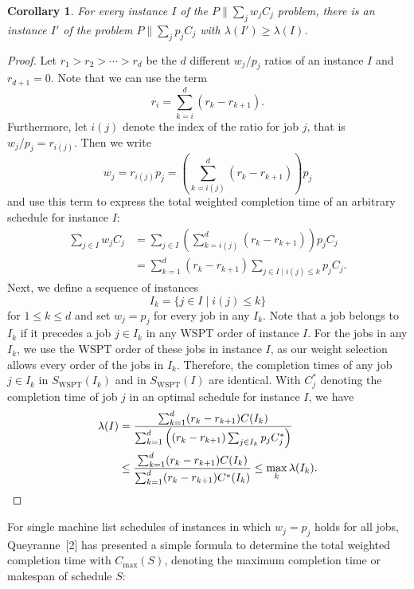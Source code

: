 \documentclass[11pt]{article}
\newtheorem{corollary}{Corollary}
\newcommand{\WSPT}{\mathrm{WSPT}}
\newcommand{\Cmax}{C_{\max}}
\begin{document}
\begin{corollary}
For every instance $I$ of the $P\|\sum_j w_j C_j$ problem, there is an
instance $I'$ of the problem $P\|\sum_j p_j C_j$ with
$\lambda(I')\geq \lambda(I)$.
\end{corollary}

\begin{proof}
Let $r_1>r_2>\cdots>r_d$ be the $d$ different $w_j/p_j$ ratios of an
instance $I$ and $r_{d+1}=0$. Note that we can use the term
\[
        r_i=\sum_{k=i}^d (r_k-r_{k+1}).
\]
Furthermore, let $i(j)$ denote the index of the ratio for job $j$, that is
$w_j/p_j=r_{i(j)}$. Then we write
\[
        w_j
        =
        r_{i(j)}p_j
        =
        \left(\sum_{k=i(j)}^d (r_k-r_{k+1})\right)p_j
\]
and use this term to express the total weighted completion time of an
arbitrary schedule for instance $I$:
\[
\begin{aligned}
        \sum_{j\in I} w_j C_j
        &=
        \sum_{j\in I}
        \left(
            \sum_{k=i(j)}^d (r_k-r_{k+1})
        \right)p_j C_j                                     \\
        &=
        \sum_{k=1}^d (r_k-r_{k+1})
        \sum_{j\in I\mid i(j)\leq k} p_j C_j .
\end{aligned}
\]
Next, we define a sequence of instances
\[
        I_k=\{j\in I\mid i(j)\leq k\}
\]
for $1\leq k\leq d$ and set $w_j=p_j$ for every job in any $I_k$. Note that
a job belongs to $I_k$ if it precedes a job $j\in I_k$ in any \(\mathrm{WSPT}\) order of
instance $I$. For the jobs in any $I_k$, we use the \(\mathrm{WSPT}\) order of these jobs
in instance $I$, as our weight selection allows every order of the jobs in
$I_k$. Therefore, the completion times of any job $j\in I_k$ in
$S_{\WSPT}(I_k)$ and in $S_{\WSPT}(I)$ are identical. With $C_j^*$ denoting the
completion time of job $j$ in an optimal schedule for instance $I$, we have
\[
\begin{aligned}
        \lambda(I)
        &=
        \frac{\sum_{k=1}^d (r_k-r_{k+1})C(I_k)}
        {\sum_{k=1}^d
        \left((r_k-r_{k+1})\sum_{j\in I_k}p_jC_j^*\right)}
        \\
        &\leq
        \frac{\sum_{k=1}^d (r_k-r_{k+1})C(I_k)}
        {\sum_{k=1}^d (r_k-r_{k+1})C^*(I_k)}
        \leq
        \max_k \lambda(I_k).
        \qedhere
\end{aligned}
\]
\end{proof}

For single machine list schedules of instances in which $w_j=p_j$ holds for
all jobs, Queyranne~[2] has presented a simple formula to determine the total
weighted completion time with $\Cmax(S)$, denoting the maximum completion
time or makespan of schedule $S$:
\end{document}
